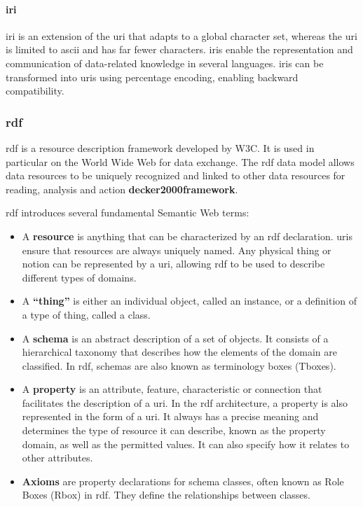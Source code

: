         
        \paragraph{\acrfull{iri}}
        \acrshort{iri} is an extension of the \acrshort{uri} that adapts to a global character set, whereas the \acrshort{uri} is limited to \acrshort{ascii} and has far fewer characters. \acrshort{iri}s enable the representation and communication of data-related knowledge in several languages. \acrshort{iri}s can be transformed into \acrshort{uri}s using percentage encoding, enabling backward compatibility.


    \subsubsection{\acrfull{rdf} \label{subsubsec:rdf}}
    \acrshort{rdf} is a resource description framework developed by W3C. It is used in particular on the World Wide Web for data exchange. The \acrshort{rdf} data model allows data resources to be uniquely recognized and linked to other data resources for reading, analysis and action \textbf{decker2000framework}. 

    \acrshort{rdf} introduces several fundamental Semantic Web terms:

    \begin{itemize}
        \item A \textbf{resource} is anything that can be characterized by an \acrshort{rdf} declaration. \acrshort{uri}s ensure that resources are always uniquely named. Any physical thing or notion can be represented by a \acrshort{uri}, allowing \acrshort{rdf} to be used to describe different types of domains.
        \item A \textbf{“thing”} is either an individual object, called an instance, or a definition of a type of thing, called a class. 
        \item A \textbf{schema} is an abstract description of a set of objects. It consists of a hierarchical taxonomy that describes how the elements of the domain are classified. In \acrshort{rdf}, schemas are also known as terminology boxes (Tboxes). 
        \item A \textbf{property} is an attribute, feature, characteristic or connection that facilitates the description of a \acrshort{uri}. In the \acrshort{rdf} architecture, a property is also represented in the form of a \acrshort{uri}. It always has a precise meaning and determines the type of resource it can describe, known as the property domain, as well as the permitted values. It can also specify how it relates to other attributes. 
        \item \textbf{Axioms} are property declarations for schema classes, often known as Role Boxes (Rbox) in \acrshort{rdf}. They define the relationships between classes.
    \end{itemize}

